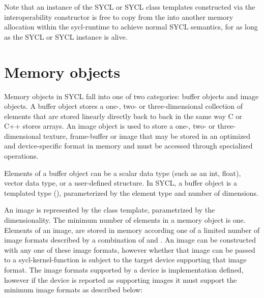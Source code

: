 Note that an instance of the SYCL  or SYCL  class templates constructed via the interoperability constructor is free to copy from the  into another memory allocation within the \gls{sycl-runtime} to achieve normal SYCL semantics, for as long as the SYCL  or SYCL  instance is alive.

\section{Memory objects}

Memory objects in SYCL fall into one of two categories: \gls{buffer} objects
and \gls{image} objects. A buffer object stores a one-, two- or
three-dimensional collection of elements that are stored linearly directly back
to back in the same way C or C++ stores arrays. An image object is used to store
a one-, two- or three-dimensional texture, frame-buffer or image that may be
stored in an optimized and device-specific format in memory and must be accessed
through specialized operations.

Elements of a buffer object can be a scalar data type (such as an int, float),
vector data type, or a user-defined structure. In SYCL, a \gls{buffer} object is a
templated type (), parameterized by the element
type and number of dimensions.

An \gls{image} is represented by the  class
template, parametrized by the dimensionality. The minimum number of elements in
a memory object is one. Elements of an \gls{image}, are stored in memory
according one of a limited number of image formats described by a combination of
 and
. An \gls{image} can be constructed
with any one of these image formats, however whether that \gls{image} can be
passed to a \gls{sycl-kernel-function} is subject to the target \gls{device}
supporting that image format. The image formats supported by a \gls{device} is
implementation defined, however if the \gls{device} is reported as supporting
images it must support the minimum image formats as described below:

